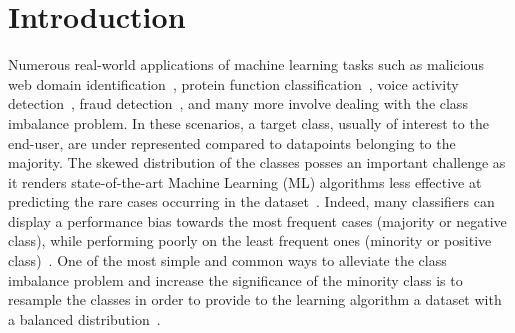 \documentclass{article}
\begin{document}
\section{Introduction}
%
Numerous real-world applications of machine learning tasks such as malicious web domain identification~\cite{huMaliciousWebDomain2019}, protein function classification~\cite{zhaoAptamerModifiedMonolithicCapillary2008}, voice activity detection~\cite{leeDualAttentionTime2020}, fraud detection~\cite{makkiImbalancedFraud2019}, and many more involve dealing with the class imbalance problem. In these scenarios, a target class, usually of interest to the end-user, are under represented compared to datapoints belonging to the majority. The skewed distribution of the classes posses an important challenge as it renders state-of-the-art Machine Learning (ML) algorithms less effective at predicting the rare cases occurring in the dataset~\cite{brancoSurveyPredictiveModeling2016}. Indeed, many classifiers can display a performance bias towards the most frequent cases (majority or negative class), while performing poorly on the least frequent ones (minority or positive class)~\cite{kaurSystematicReviewImbalanced2019}. One of the most simple and common ways to alleviate the class imbalance problem and increase the significance of the minority class is to resample the classes in order to provide to the learning algorithm a dataset with a balanced distribution~\cite{heImbalancedLearning2009}. 
\end{document}
